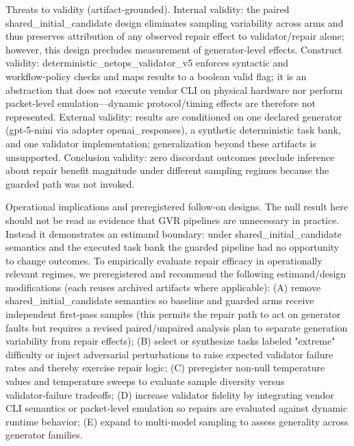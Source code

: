 \documentclass[conference]{IEEEtran}
\begin{document}
Threats to validity (artifact‑grounded). Internal validity: the paired shared\_initial\_candidate design eliminates sampling variability across arms and thus preserves attribution of any observed repair effect to validator/repair alone; however, this design precludes measurement of generator‑level effects. Construct validity: deterministic\_netops\_validator\_v5 enforces syntactic and workflow‑policy checks and maps results to a boolean valid flag; it is an abstraction that does not execute vendor CLI on physical hardware nor perform packet‑level emulation---dynamic protocol/timing effects are therefore not represented. External validity: results are conditioned on one declared generator (gpt‑5‑mini via adapter openai\_responses), a synthetic deterministic task bank, and one validator implementation; generalization beyond these artifacts is unsupported. Conclusion validity: zero discordant outcomes preclude inference about repair benefit magnitude under different sampling regimes because the guarded path was not invoked.

Operational implications and preregistered follow‑on designs. The null result here should not be read as evidence that GVR pipelines are unnecessary in practice. Instead it demonstrates an estimand boundary: under shared\_initial\_candidate semantics and the executed task bank the guarded pipeline had no opportunity to change outcomes. To empirically evaluate repair efficacy in operationally relevant regimes, we preregistered and recommend the following estimand/design modifications (each reuses archived artifacts where applicable): (A) remove shared\_initial\_candidate semantics so baseline and guarded arms receive independent first‑pass samples (this permits the repair path to act on generator faults but requires a revised paired/unpaired analysis plan to separate generation variability from repair effects); (B) select or synthesize tasks labeled "extreme" difficulty or inject adversarial perturbations to raise expected validator failure rates and thereby exercise repair logic; (C) preregister non‑null temperature values and temperature sweeps to evaluate sample diversity versus validator‑failure tradeoffs; (D) increase validator fidelity by integrating vendor CLI semantics or packet‑level emulation so repairs are evaluated against dynamic runtime behavior; (E) expand to multi‑model sampling to assess generality across generator families.
\end{document}
